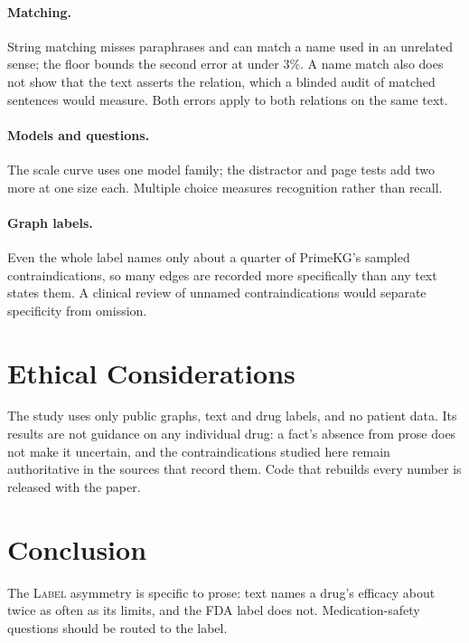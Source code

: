 \documentclass[letterpaper]{article} %
\newcommand{\lbl}{\textsc{Label}}
\begin{document}
\paragraph{Matching.} String matching misses paraphrases and can match a name
used in an unrelated sense; the floor bounds the second error at under 3\%. A
name match also does not show that the text asserts the relation, which a
blinded audit of matched sentences would measure. Both errors apply to both
relations on the same text.

\paragraph{Models and questions.} The scale curve uses one model family; the
distractor and page tests add two more at one size each. Multiple choice
measures recognition rather than recall.

\paragraph{Graph labels.} Even the whole label names only about a quarter of
PrimeKG's sampled contraindications, so many edges are recorded more
specifically than any text states them. A clinical review of unnamed
contraindications would separate specificity from omission.

\section{Ethical Considerations}

The study uses only public graphs, text and drug labels, and no patient data.
Its results are not guidance on any individual drug: a fact's absence from
prose does not make it uncertain, and the contraindications studied here remain
authoritative in the sources that record them. Code that rebuilds every number
is released with the paper.

\section{Conclusion}

The \lbl{} asymmetry is specific to prose: text names a drug's efficacy about
twice as often as its limits, and the FDA label does not. Medication-safety
questions should be routed to the label.


\end{document}
